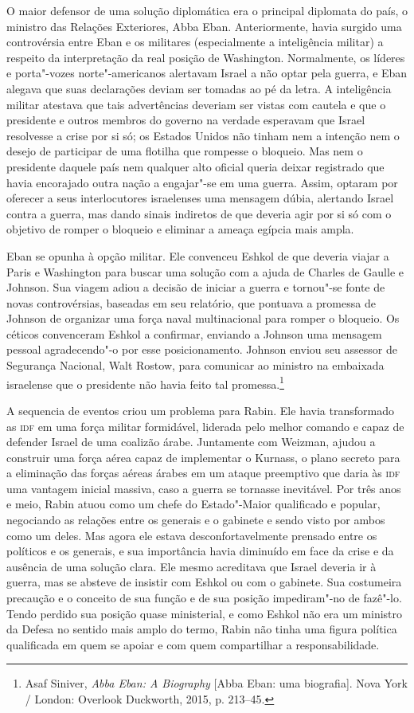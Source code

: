 O maior defensor de uma solução diplomática era o principal diplomata do
país, o ministro das Relações Exteriores, Abba Eban. Anteriormente,
havia surgido uma controvérsia entre Eban e os militares (especialmente
a inteligência militar) a respeito da interpretação da real posição de
Washington. Normalmente, os líderes e porta"-vozes norte"-americanos
alertavam Israel a não optar pela guerra, e Eban alegava que suas
declarações deviam ser tomadas ao pé da letra. A inteligência militar
atestava que tais advertências deveriam ser vistas com cautela e que o
presidente e outros membros do governo na verdade esperavam que Israel
resolvesse a crise por si só; os Estados Unidos não tinham nem a intenção nem o
desejo de participar de uma flotilha que rompesse o bloqueio. Mas nem o
presidente daquele país nem qualquer alto oficial queria deixar registrado
que havia encorajado outra nação a engajar"-se em uma guerra. Assim,
optaram por oferecer a seus interlocutores israelenses uma mensagem
dúbia, alertando Israel contra a guerra, mas dando sinais indiretos de
que deveria agir por si só com o objetivo de romper o bloqueio e
eliminar a ameaça egípcia mais ampla.

Eban se opunha à opção militar. Ele convenceu Eshkol de que deveria
viajar a Paris e Washington para buscar uma solução com a ajuda de
Charles de Gaulle e Johnson. Sua viagem adiou a decisão de iniciar a
guerra e tornou"-se fonte de novas controvérsias, baseadas em seu
relatório, que pontuava a promessa de Johnson de organizar uma força naval
multinacional para romper o bloqueio. Os céticos convenceram Eshkol a
confirmar, enviando a Johnson uma mensagem pessoal agradecendo"-o por
esse posicionamento. Johnson enviou seu assessor de Segurança Nacional,
Walt Rostow, para comunicar ao ministro na embaixada israelense que o
presidente não havia feito tal promessa.\footnote{Asaf Siniver, \textit{Abba Eban: A Biography} {[}Abba Eban: uma biografia{]}. Nova York / London: Overlook
Duckworth, 2015, p. 213--45.}

A sequencia de eventos criou um problema para Rabin. Ele havia
transformado as \textsc{idf} em uma força militar formidável, liderada pelo
melhor comando e capaz de defender Israel de uma coalizão árabe.
Juntamente com Weizman, ajudou a construir uma força aérea capaz de
implementar o Kurnass, o plano secreto para a eliminação das forças
aéreas árabes em um ataque preemptivo que daria às \textsc{idf} uma vantagem
inicial massiva, caso a guerra se tornasse inevitável. Por três anos e
meio, Rabin atuou como um chefe do Estado"-Maior qualificado e popular,
negociando as relações entre os generais e o gabinete e sendo visto por
ambos como um deles. Mas agora ele estava desconfortavelmente prensado
entre os políticos e os generais, e sua importância havia diminuído em
face da crise e da ausência de uma solução clara. Ele mesmo acreditava
que Israel deveria ir à guerra, mas se absteve de insistir com Eshkol ou
com o gabinete. Sua costumeira precaução e o conceito de sua função e de
sua posição impediram"-no de fazê"-lo. Tendo perdido sua posição quase
ministerial, e como Eshkol não era um ministro da Defesa no sentido mais
amplo do termo, Rabin não tinha uma figura política qualificada em quem
se apoiar e com quem compartilhar a responsabilidade.

